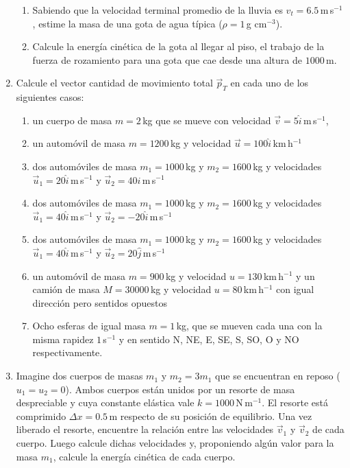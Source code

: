 \documentclass[a4paper,12pt]{article}
\begin{document}
\begin{enumerate}
    \begin{enumerate}
      \item Sabiendo que la velocidad terminal promedio de la lluvia es $v_t=6.5$\,m\,s$^{-1}$, estime la masa de una gota de agua típica ($\rho=1$\,g cm$^{-3}$).
      \item Calcule la energía cinética de la gota al llegar al piso, el trabajo de la fuerza de rozamiento para una gota que cae desde una altura de $1000$\,m. 
    \end{enumerate}
  \item Calcule el vector cantidad de movimiento total $\vec p_T$ en cada uno de los siguientes casos:
    \begin{enumerate}
      \item un cuerpo de masa $m=2$\,kg que se mueve con velocidad $\vec v=5 \hat i$\,m\,s$^{-1}$,
      \item un automóvil de masa $m=1200$\,kg y velocidad $\vec u=100 \hat i$\,km\,h$^{-1}$
      \item dos automóviles de masa $m_1=1000$\,kg y $m_2=1600$\,kg y velocidades $\vec u_1=20 \hat i$\,m\,s$^{-1}$ y $\vec u_2=40 \hat i $\,m\,s$^{-1}$
      \item dos automóviles de masa $m_1=1000$\,kg y $m_2=1600$\,kg y velocidades $\vec u_1=40 \hat i$\,m\,s$^{-1}$ y $\vec u_2=-20 \hat i$\,m\,s$^{-1}$
      \item dos automóviles de masa $m_1=1000$\,kg y $m_2=1600$\,kg y velocidades $\vec u_1=40 \hat i$\,m\,s$^{-1}$ y $\vec u_2=20 \hat j$\,m\,s$^{-1}$
      \item un automóvil de masa $m=900$\,kg y velocidad $u=130$\,km\,h$^{-1}$ y un camión de masa $M=30000$\,kg y velocidad $u=80$\,km\,h$^{-1}$ con igual dirección pero sentidos opuestos
      \item Ocho esferas de igual masa $m=1$\,kg, que se mueven cada una con la misma rapidez $1$\,s$^{-1}$ y en sentido N, NE, E, SE, S, SO, O y NO respectivamente.
    \end{enumerate}

  \item Imagine dos cuerpos de masas $m_1$ y $m_2=3 m_1$ que se encuentran en reposo ($u_1=u_2=0$). Ambos cuerpos están unidos por un resorte de masa despreciable y cuya constante elástica vale $k=1000$\,N\,m$^{-1}$. El resorte está comprimido $\Delta x=0.5$\,m respecto de su posición de equilibrio. Una vez liberado el resorte, encuentre la relación entre las velocidades $\vec v_1$ y $\vec v_2$ de cada cuerpo. Luego calcule dichas velocidades y, proponiendo algún valor para la masa $m_1$, calcule la energía cinética de cada cuerpo.


\end{enumerate}
\end{document}
